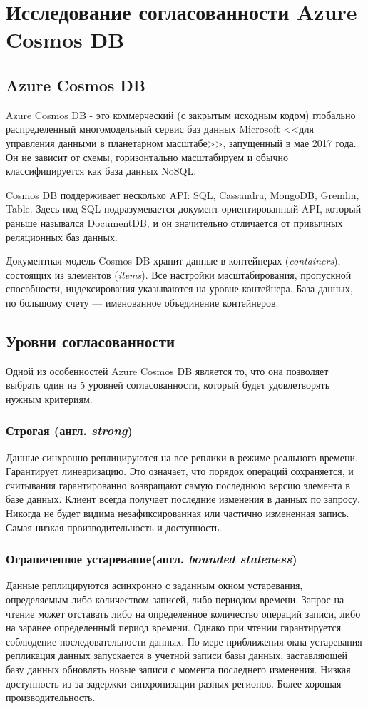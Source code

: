 \documentclass[12pt,  openany]{book}
\begin{document}
\chapter{Исследование согласованности Azure Cosmos DB}
\section{Azure Cosmos DB}
Azure Cosmos DB - это коммерческий (с закрытым исходным кодом) глобально распределенный многомодельный сервис баз данных Microsoft <<для управления данными в планетарном масштабе>>, запущенный в мае 2017 года. Он не зависит от схемы, горизонтально масштабируем и обычно классифицируется как база данных NoSQL.
\par Cosmos DB поддерживает несколько API: SQL, Cassandra, MongoDB, Gremlin, Table. Здесь под SQL подразумевается документ-ориентированный API, который раньше назывался DocumentDB, и он значительно отличается от привычных реляционных баз данных.
\par Документная модель Cosmos DB хранит данные в контейнерах (\textit{containers}), состоящих из элементов (\textit{items}). Все настройки масштабирования, пропускной способности, индексирования указываются на уровне контейнера. База данных, по большому счету --- именованное объединение контейнеров.

\section{Уровни согласованности \cite{cosmosConsistencyLevels}}
Одной из особенностей Azure Cosmos DB является то, что она позволяет выбрать один из 5 уровней согласованности, который будет удовлетворять нужным критериям.
\subsection{Строгая (англ.  \textit{strong})}
Данные синхронно реплицируются на все реплики в режиме реального времени. Гарантирует линеаризацию. Это означает, что порядок операций сохраняется, и считывания гарантированно возвращают самую последнюю версию элемента в базе данных. Клиент всегда получает последние изменения в данных по запросу. Никогда не будет видима незафиксированная или частично измененная запись. Самая низкая производительность и доступность.
\subsection{Ограниченное устаревание(англ.  \textit{bounded staleness})}
Данные реплицируются асинхронно с заданным окном устаревания, определяемым либо количеством записей, либо периодом времени. Запрос на чтение может отставать либо на определенное количество операций записи, либо на заранее определенный период времени. Однако при чтении гарантируется соблюдение последовательности данных. По мере приближения окна устаревания репликация данных запускается в учетной записи базы данных, заставляющей базу данных обновлять новые записи с момента последнего изменения. Низкая доступность из-за задержки синхронизации разных регионов. Более хорошая производительность.
\end{document}
